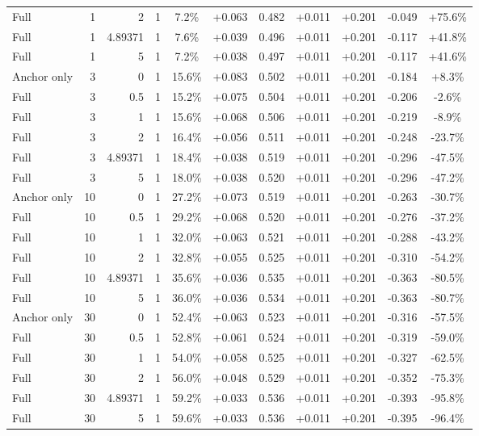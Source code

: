 \begin{table}[htbp]
\begin{tabular}{lrrrccccccc}
Full & 1 & 2 & 1 & 7.2\% & +0.063 & 0.482 & +0.011 & +0.201 & -0.049 & +75.6\% \\
Full & 1 & 4.89371 & 1 & 7.6\% & +0.039 & 0.496 & +0.011 & +0.201 & -0.117 & +41.8\% \\
Full & 1 & 5 & 1 & 7.2\% & +0.038 & 0.497 & +0.011 & +0.201 & -0.117 & +41.6\% \\
Anchor only & 3 & 0 & 1 & 15.6\% & +0.083 & 0.502 & +0.011 & +0.201 & -0.184 & +8.3\% \\
Full & 3 & 0.5 & 1 & 15.2\% & +0.075 & 0.504 & +0.011 & +0.201 & -0.206 & -2.6\% \\
Full & 3 & 1 & 1 & 15.6\% & +0.068 & 0.506 & +0.011 & +0.201 & -0.219 & -8.9\% \\
Full & 3 & 2 & 1 & 16.4\% & +0.056 & 0.511 & +0.011 & +0.201 & -0.248 & -23.7\% \\
Full & 3 & 4.89371 & 1 & 18.4\% & +0.038 & 0.519 & +0.011 & +0.201 & -0.296 & -47.5\% \\
Full & 3 & 5 & 1 & 18.0\% & +0.038 & 0.520 & +0.011 & +0.201 & -0.296 & -47.2\% \\
Anchor only & 10 & 0 & 1 & 27.2\% & +0.073 & 0.519 & +0.011 & +0.201 & -0.263 & -30.7\% \\
Full & 10 & 0.5 & 1 & 29.2\% & +0.068 & 0.520 & +0.011 & +0.201 & -0.276 & -37.2\% \\
Full & 10 & 1 & 1 & 32.0\% & +0.063 & 0.521 & +0.011 & +0.201 & -0.288 & -43.2\% \\
Full & 10 & 2 & 1 & 32.8\% & +0.055 & 0.525 & +0.011 & +0.201 & -0.310 & -54.2\% \\
Full & 10 & 4.89371 & 1 & 35.6\% & +0.036 & 0.535 & +0.011 & +0.201 & -0.363 & -80.5\% \\
Full & 10 & 5 & 1 & 36.0\% & +0.036 & 0.534 & +0.011 & +0.201 & -0.363 & -80.7\% \\
Anchor only & 30 & 0 & 1 & 52.4\% & +0.063 & 0.523 & +0.011 & +0.201 & -0.316 & -57.5\% \\
Full & 30 & 0.5 & 1 & 52.8\% & +0.061 & 0.524 & +0.011 & +0.201 & -0.319 & -59.0\% \\
Full & 30 & 1 & 1 & 54.0\% & +0.058 & 0.525 & +0.011 & +0.201 & -0.327 & -62.5\% \\
Full & 30 & 2 & 1 & 56.0\% & +0.048 & 0.529 & +0.011 & +0.201 & -0.352 & -75.3\% \\
Full & 30 & 4.89371 & 1 & 59.2\% & +0.033 & 0.536 & +0.011 & +0.201 & -0.393 & -95.8\% \\
Full & 30 & 5 & 1 & 59.6\% & +0.033 & 0.536 & +0.011 & +0.201 & -0.395 & -96.4\% \\

\end{tabular}
\end{table}
